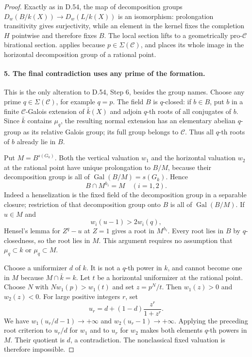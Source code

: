 \begin{proof}
Exactly as in D.54, the map of decomposition groups
$D_w(B/k(X))\to D_w(L/k(X))$ is an isomorphism: prolongation
transitivity gives surjectivity, while an element in the kernel
fixes the completion $H$ pointwise and therefore fixes $B$.
The local section lifts to a geometrically pro-$\mathcal C$
birational section.  \cite[Proposition 1.7]{DE_Hoshi2012} applies because
$p\in\Sigma(\mathcal C)$, and places its whole image in the
horizontal decomposition group of a rational point.

\paragraph{5. The final contradiction uses any prime of the formation.}

This is the only alteration to D.54, Step 6, besides the group
names.  Choose any prime $q\in\Sigma(\mathcal C)$, for example
$q=p$.  The field $B$ is $q$-closed: if $b\in B$, put $b$ in a
finite $\mathcal C$-Galois extension of $\bar k(X)$ and adjoin
$q$-th roots of all conjugates of $b$.  Since $\bar k$ contains
$\mu_q$, the resulting normal extension has an elementary
abelian $q$-group as its relative Galois group; its full group
belongs to $\mathcal C$.  Thus all $q$-th roots of $b$ already
lie in $B$.

Put $M=B^{s(G_k)}$.  Both the vertical valuation $w_1$ and the
horizontal valuation $w_2$ at the rational point have unique
prolongation to $B/M$, because their decomposition group is all
of $\operatorname{Gal}(B/M)=s(G_k)$.  Hence
\[
                          B\cap M^{h_i}=M\quad(i=1,2).
\]
Indeed a henselization is the fixed field of the decomposition
group in a separable closure; restriction of that decomposition
group onto $B$ is all of $\operatorname{Gal}(B/M)$.
If $u\in M$ and
\[
                       w_i(u-1)>2w_i(q),
\]
Hensel's lemma for $Z^q-u$ at $Z=1$ gives a root in $M^{h_i}$.
Every root lies in $B$ by $q$-closedness, so the root lies in $M$.
This argument requires no assumption that $\mu_q\subset k$ or
$\mu_q\subset M$.

Choose a uniformizer $d$ of $k$.  It is not a $q$-th power in $k$,
and cannot become one in $M$ because $M\cap\bar k=k$.  Let $t$ be
a horizontal uniformizer at the rational point.  Choose $N$ with
$Nw_1(p)>w_1(t)$ and set $z=p^N/t$.  Then $w_1(z)>0$ and
$w_2(z)<0$.  For large positive integers $r$, set
\[
                  u_r=d+(1-d)\frac{z^r}{1+z^r}.
\]
We have $w_1(u_r/d-1)\to+\infty$ and
$w_2(u_r-1)\to+\infty$.  Applying the preceding root criterion
to $u_r/d$ for $w_1$ and to $u_r$ for $w_2$ makes both elements
$q$-th powers in $M$.  Their quotient is $d$, a contradiction.
The nonclassical fixed valuation is therefore impossible.


\end{proof}
